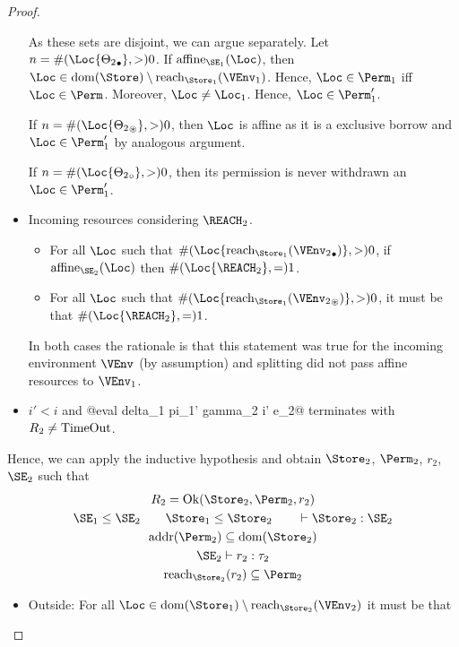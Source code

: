 \begin{proof}
\begin{itemize}
    As these sets are disjoint, we can argue separately.
    Let $n = \MultiNumber\Loc{\Active{\Theta_2}}>0$.
    If $\Affine{\SE_1}\Loc$, then $\Loc \in \Dom{\Store} \setminus
    \Reach{\Store_1}{\VEnv_1}$. Hence, $\Loc\in\Perm_1$ iff
    $\Loc\in\Perm$. Moreover, $\Loc\ne\Loc_1$. Hence,
    $\Loc\in\Perm_1'$.

    If  $n = \MultiNumber\Loc{\MutableBorrows{\Theta_2}}>0$,
    then $\Loc$ is affine as it is a exclusive borrow and
    $\Loc\in\Perm_1'$ by analogous argument.

    If  $n = \MultiNumber\Loc{\ImmutableBorrows{\Theta_2}}>0$,
    then its permission is never withdrawn an $\Loc\in\Perm_1'$.
  \item Incoming resources considering $\REACH_2$.
    \begin{itemize}
    \item
      For all $\Loc$ such that $\MultiNumber\Loc{\Reach{\Store_1}{\Active{\VEnv_2}}} >0$,
      if $\Affine{\SE_2}\Loc$ then $\MultiNumber\Loc{\REACH_2}= 1$.
    \item For all $\Loc$ such that $
      \MultiNumber\Loc{\Reach{\Store_1}{\MutableBorrows{\VEnv_2}}} >0$, it
      must be that $\MultiNumber\Loc{\REACH_2}=1$.
    \end{itemize}
    In both cases the rationale is that this statement was true for
    the incoming environment $\VEnv$ (by assumption) and splitting did
    not pass affine resources to $\VEnv_1$.
  \item $i'<i$ and  @eval delta_1 pi_1' gamma_2 i' e_2@ terminates
    with $R_2 \ne \operatorname{TimeOut}$.
  \end{itemize}
  Hence, we can apply the inductive hypothesis and obtain
  $\Store_2$, $\Perm_2$, $r_2$, $\SE_2$ such that
  \begin{gather}
    \label{eq:6}
    R_2 = \Ok{\Store_2, \Perm_2, r_2}
    \\\label{eq:7}
    \SE_1 \le \SE_2 \qquad
    \Store_1 \le \Store_2 \qquad
    \vdash \Store_2 :  \SE_2
    \\\label{eq:9}
    \Addresses{\Perm_2} \subseteq \Dom{\Store_2}
    \\\label{eq:8}
    \SE_2 \vdash r_2 : \tau_2
    \\\label{eq:11}
    \Reach{\Store_2}{r_2} \subseteq \Perm_2
  \end{gather}
  \begin{itemize}
  \item Outside: For all $\Loc \in \Dom{\Store_1} \setminus
    \Reach{\Store_2}{\VEnv_2}$ it must be that

\end{itemize}
\end{proof}
